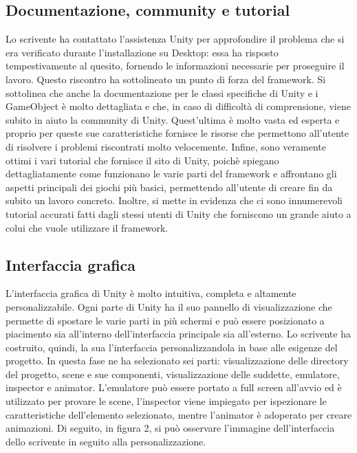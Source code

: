 \subsection{Documentazione, community e tutorial}

Lo scrivente ha contattato l’assistenza Unity per approfondire il problema che si era verificato durante l’installazione su Desktop: essa ha risposto tempestivamente al quesito, fornendo le informazioni necessarie per proseguire il lavoro. Questo riscontro ha sottolineato un punto di forza del framework.
Si sottolinea che anche la documentazione per le classi specifiche di Unity e i GameObject è molto dettagliata e che, in caso di difficoltà di comprensione, viene subito in aiuto la community di Unity. Quest’ultima è molto vasta ed esperta e proprio per queste sue caratteristiche fornisce le risorse che permettono all’utente di risolvere i problemi riscontrati molto velocemente.
Infine, sono veramente ottimi i vari tutorial che fornisce il sito di Unity, poichè spiegano dettagliatamente come funzionano le varie parti del framework e affrontano gli aspetti principali dei giochi più basici, permettendo all’utente di creare fin da subito un lavoro concreto. Inoltre, si mette in evidenza che ci sono innumerevoli tutorial accurati fatti dagli stessi utenti di Unity che forniscono un grande aiuto a colui che vuole utilizzare il framework.

\subsection{Interfaccia grafica}

L’interfaccia grafica di Unity è molto intuitiva, completa e altamente personalizzabile. Ogni parte di Unity ha il suo pannello di visualizzazione che permette di spostare le varie parti in più schermi e può essere posizionato a piacimento sia all’interno dell’interfaccia principale sia all’esterno.
Lo scrivente ha costruito, quindi, la sua l’interfaccia personalizzandola in base alle esigenze del progetto. In questa fase ne ha selezionato sei parti: visualizzazione delle directory del progetto, scene e sue componenti, visualizzazione delle suddette, emulatore, inspector e animator. L’emulatore può essere portato a full screen all’avvio ed è utilizzato per provare le scene, l’inspector viene impiegato per ispezionare le caratteristiche dell’elemento selezionato, mentre l’animator è adoperato per creare animazioni. Di seguito, in figura 2, si può osservare l’immagine dell’interfaccia dello scrivente in seguito alla personalizzazione.

